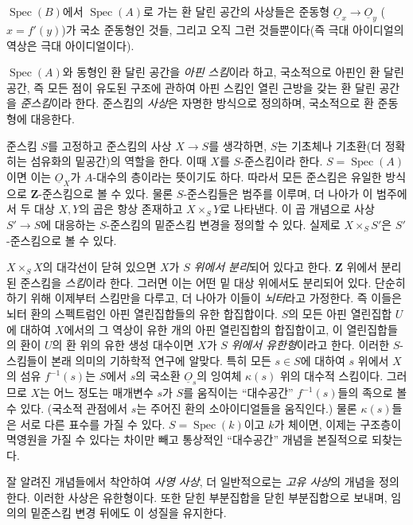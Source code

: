 \documentclass[11pt,twoside,openany]{book}
\numberwithin{equation}{section}
\newcommand{\sourceunit}{front}
\newcommand{\src}[1]{%
  \phantomsection\hypertarget{src:\sourceunit:#1}{}%
  \marginpar{\raggedleft\footnotesize\sffamily #1}%
}
\newcommand{\Osh}{\underline{O}}
\theoremstyle{plain}
\theoremstyle{definition}
\theoremstyle{remark}
\begin{document}
\src{194}
$\operatorname{Spec}(B)$에서 $\operatorname{Spec}(A)$로 가는 환 달린
공간의 사상들은 준동형 $\Osh_x\longrightarrow\Osh_y$ ($x=f'(y)$)가
국소 준동형인 것들, 그리고 오직 그런 것들뿐이다(즉 극대 아이디얼의
역상은 극대 아이디얼이다).

$\operatorname{Spec}(A)$와 동형인 환 달린 공간을 \emph{아핀 스킴}이라 하고,
국소적으로 아핀인 환 달린 공간, 즉 모든 점이 유도된 구조에 관하여 아핀
스킴인 열린 근방을 갖는 환 달린 공간을 \emph{준스킴}이라 한다. 준스킴의
\emph{사상}은 자명한 방식으로 정의하며, 국소적으로 환 준동형에 대응한다.

준스킴 $S$를 고정하고 준스킴의 사상 $X\longrightarrow S$를 생각하면,
$S$는 기초체나 기초환(더 정확히는 섬유화의 밑공간)의 역할을 한다. 이때
$X$를 $S$-준스킴이라 한다. $S=\operatorname{Spec}(A)$이면 이는
$\Osh_X$가 $A$-대수의 층이라는 뜻이기도 하다. 따라서 모든 준스킴은
유일한 방식으로 $\mathbf Z$-준스킴으로 볼 수 있다. 물론 $S$-준스킴들은
범주를 이루며, 더 나아가 이 범주에서 두 대상 $X,Y$의 곱은 항상 존재하고
$X\times_S Y$로 나타낸다. 이 곱 개념으로 사상
$S'\longrightarrow S$에 대응하는 $S$-준스킴의 밑준스킴 변경을 정의할
수 있다. 실제로 $X\times_S S'$은 $S'$-준스킴으로 볼 수 있다.

$X\times_S X$의 대각선이 닫혀 있으면 $X$가 $S$ \emph{위에서 분리}되어
있다고 한다. $\mathbf Z$ 위에서 분리된 준스킴을 \emph{스킴}이라 한다.
그러면 이는 어떤 밑 대상 위에서도 분리되어 있다. 단순히 하기 위해 이제부터
스킴만을 다루고, 더 나아가 이들이 \emph{뇌터}라고 가정한다. 즉 이들은
뇌터 환의 스펙트럼인 아핀 열린집합들의 유한 합집합이다. $S$의 모든 아핀
열린집합 $U$에 대하여 $X$에서의 그 역상이 유한 개의 아핀 열린집합의
합집합이고, 이 열린집합들의 환이 $U$의 환 위의 유한 생성 대수이면 $X$가
$S$ \emph{위에서 유한형}이라고 한다. 이러한 $S$-스킴들이 본래 의미의
기하학적 연구에 알맞다. 특히 모든 $s\in S$에 대하여 $s$ 위에서 $X$의
섬유 $f^{-1}(s)$는 $S$에서 $s$의 국소환 $\Osh_s$의 잉여체
$\kappa(s)$ 위의 대수적 스킴이다. 그러므로 $X$는 어느 정도는 매개변수
$s$가 $S$를 움직이는 ``대수공간'' $f^{-1}(s)$들의 족으로 볼 수 있다.
(국소적 관점에서 $s$는 주어진 환의 소아이디얼들을 움직인다.) 물론
$\kappa(s)$들은 서로 다른 표수를 가질 수 있다. $S=\operatorname{Spec}(k)$이고
$k$가 체이면, 이제는 구조층이 멱영원을 가질 수 있다는 차이만 빼고 통상적인
``대수공간'' 개념을 본질적으로 되찾는다.

\src{195}
잘 알려진 개념들에서 착안하여 \emph{사영 사상}, 더 일반적으로는
\emph{고유 사상}의 개념을 정의한다. 이러한 사상은 유한형이다. 또한 닫힌
부분집합을 닫힌 부분집합으로 보내며, 임의의 밑준스킴 변경 뒤에도 이 성질을
유지한다.
\end{document}
